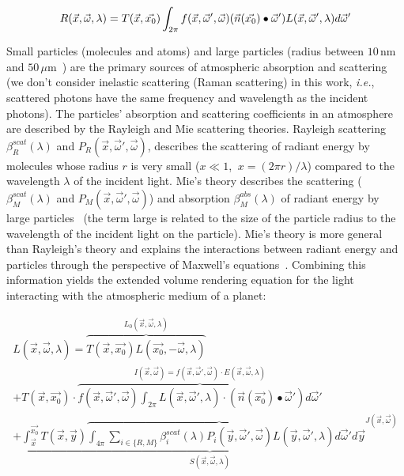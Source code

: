 \documentclass[journal]{vgtc}                %
\newcommand{\review}[1]{{\color{blue}#1}}
\begin{document}
\begin{equation}\label{eq:reflected_light}
\small
R(\vec{x}, \vec{\omega}, \lambda) = T(\vec{x}, \vec{x_0}) \int_{2\pi}{ f(\vec{x}, \vec{\omega}', \vec{\omega})(\vec{n}(\vec{x_0}) \bullet  \vec{\omega}') L(\vec{x},\vec{\omega}', \lambda)d\vec{\omega}'}
\end{equation}

Small particles (molecules and atoms) and large particles (radius between $10\,\text{nm}$ and $50\,\mu \text{m}$~\cite{Thomas:2017}) are the primary sources of atmospheric absorption and scattering (we don't consider inelastic scattering (Raman scattering) in this work, \textit{i.e.}, scattered photons have the same frequency and wavelength as the incident photons). The particles' absorption and scattering coefficients in an atmosphere are described by the Rayleigh and Mie scattering theories. Rayleigh scattering~\cite{Rayleigh:1871} $\beta_R^{scat}(\lambda)$ and $P_R(\vec{x}, \vec{\omega}', \vec{\omega})$, describes the scattering of radiant energy by molecules \review{whose} radius $r$ is very small ($x \ll 1$, $\ x=(2\pi r)/\lambda$) compared to the wavelength $\lambda$ of the incident light. Mie's theory describes the scattering ($\beta_M^{scat}(\lambda)$ and $P_M(\vec{x}, \vec{\omega}', \vec{\omega})$) and absorption $\beta_M^{abs}(\lambda)$ of radiant energy by large particles~\cite{Hulst:1981, Mishchenko:2006} (the term large is related to the size of the particle radius to the wavelength of the incident light on the particle). Mie's theory is more general than Rayleigh's theory and explains the interactions between radiant energy and particles through the perspective of Maxwell's equations~\cite{Mishchenko:2002}. Combining this information yields the extended volume rendering equation for the light interacting with the atmospheric %
medium of a planet: 

\vspace*{-5mm}
{
\small
\begin{multline}\label{eq:ATM_VRE}
L(\vec{x},\vec{\omega}, \lambda) = \overbrace{ T(\vec{x}, \vec{x_0})L(\vec{x_0},-\vec{\omega}, \lambda) }^{L_0(\vec{x}, \vec{\omega}, \lambda)}\\
+ T(\vec{x}, \vec{x_0}) \cdot \overbrace{f(\vec{x}, \vec{\omega}', \vec{\omega}) \int_{2\pi}{L(\vec{x},\vec{\omega}', \lambda) \cdot (\vec{n}(\vec{x_0}) \bullet  \vec{\omega}') d\vec{\omega}'}}^{I(\vec{x}, \vec{\omega}) = f(\vec{x}, \vec{\omega}', \vec{\omega}) \cdot E(\vec{x}, \vec{\omega}, \lambda)}\\
+ \underbrace{\int_{\vec{x}}^{\vec{x_0}}{T(\vec{x}, \vec{y}) \overbrace{\int_{4\pi}{ \sum_{i \in \{R,M\}} \beta_{i}^{scat}(\lambda)P_i(\vec{y}, \vec{\omega}', \vec{\omega})L(\vec{y},\vec{\omega}', \lambda)d\vec{\omega}'}}d\vec{y}}^{J(\vec{x}, \vec{\omega})} }_{S(\vec{x}, \vec{\omega}, \lambda)}
\end{multline} 
}
\vspace*{-3mm}
\end{document}
